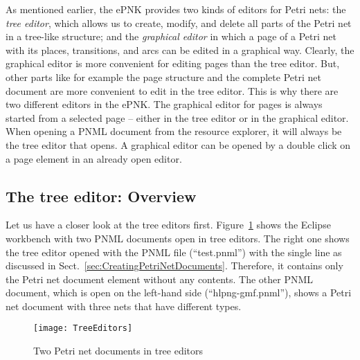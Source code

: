 As mentioned earlier, the ePNK provides two kinds of editors
for Petri nets: the \emph{tree editor}, which allows us to create,
modify, and delete all parts of the Petri net in a tree-like
structure; and the \emph{graphical editor}%
in which a page
of a Petri net with its places, transitions, and arcs can
be edited in a graphical way. Clearly, the graphical editor
is more convenient for editing pages than the tree editor.
But, other parts like for example the page structure and the
complete Petri net document are more convenient to edit in the
tree editor. This is why there are two different editors in the ePNK.
The graphical editor for pages is always started from a
selected page -- either in the tree editor or in the graphical
editor. When opening a PNML document from the resource explorer,
it will always be the tree editor that opens. A graphical editor
can be opened by a double click on a page element in an already 
open editor.

\subsection{The tree editor: Overview}
Let us have a closer look at the tree editors first.
Figure~\ref{fig:tree.editors} shows the Eclipse workbench with
two PNML documents open in tree editors. The right one shows the tree editor
opened with the PNML file (``test.pnml'') with the single line as discussed in
Sect.~\ref{sec:CreatingPetriNetDocuments}. Therefore, it contains only the
Petri net document element without any contents. The other PNML document, which
is open on the left-hand side (``hlpng-gmf.pnml''), shows a Petri net document
with three nets that have different types.
 
\begin{figure}[hbt!!]
  \centerline{\texttt{[image: TreeEditors]}}
  \caption{Two Petri net documents in tree editors}
  \label{fig:tree.editors}
\end{figure}


